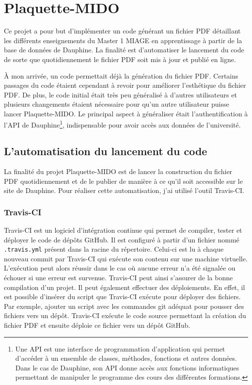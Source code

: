 \chapter[Plaquette-MIDO]{Plaquette-MIDO\raisebox{.3\baselineskip}{\normalsize\footnotemark}}

Ce projet a pour but d'implémenter un code générant un fichier PDF détaillant les différents enseignements du Master 1 MIAGE en apprentissage à partir de la base de données de Dauphine. La finalité est d'automatiser le lancement du code de sorte que quotidiennement le fichier PDF soit mis à jour et publié en ligne.

À mon arrivée, un code permettait déjà la génération du fichier PDF. Certains passages du code étaient cependant à revoir pour améliorer l'esthétique du fichier PDF. De plus, le code initial était très peu généralisé à d'autres utilisateurs et plusieurs changements étaient nécessaire pour qu'un autre utilisateur puisse lancer Plaquette-MIDO. Le principal aspect à généraliser était l'authentification à l'API de Dauphine\footnote{Une API est une interface de programmation d’application qui permet d'accéder à un ensemble de classes, méthodes, fonctions et autres données. Dans le cas de Dauphine, son API donne accès aux fonctions informatiques permettant de manipuler le programme des cours des différentes formations.}, indispensable pour avoir accès aux données de l'université.

\section{L'automatisation du lancement du code}
\label{sec:automatisation}

La finalité du projet Plaquette-MIDO est de lancer la construction du fichier PDF quotidiennement et de le publier de manière à ce qu'il soit accessible sur le site de Dauphine. Pour réaliser cette automatisation, j'ai utilisé l'outil Travis-CI.

\subsection{Travis-CI}
    Travis-CI est un logiciel d'intégration continue qui permet de compiler,
    tester et déployer le code de dépôts GitHub. Il est configuré à partir
    d'un fichier nommé \texttt{.travis.yml} présent dans la racine du
    répertoire. Celui-ci est lu à chaque nouveau commit par Travis-CI qui
    exécute son contenu sur une machine virtuelle. L'exécution peut alors
    réussir dans le cas où aucune erreur n'a été signalée ou échouer si une
    erreur est survenue. Travis-CI peut ainsi s'assurer de la bonne
    compilation d'un projet. Il peut également effectuer des déploiements.
    En effet, il est possible d'insérer du script que Travis-CI exécute pour
    déployer des fichiers. Par exemple, ajouter un script avec les commandes
    git adéquat pour pousser des fichiers vers un dépôt. Travis-CI exécute le code source permettant la création du fichier PDF et ensuite
    déploie ce fichier vers un dépôt GitHub.

